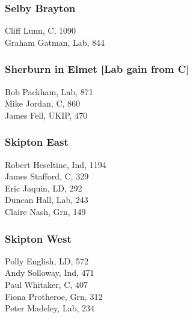 \documentclass[a4paper,openany,10pt]{book}
\begin{document}
\subsubsection*{Selby Brayton}



Cliff Lunn, C, 1090\\
Graham Gatman, Lab, 844\\


\subsubsection*{Sherburn in Elmet \hspace*{\fill}\nolinebreak[1]%
\enspace\hspace*{\fill}
[Lab gain from C]}



Bob Packham, Lab, 871\\
Mike Jordan, C, 860\\
James Fell, UKIP, 470\\


\subsubsection*{Skipton East}



Robert Heseltine, Ind, 1194\\
James Stafford, C, 329\\
Eric Jaquin, LD, 292\\
Duncan Hall, Lab, 243\\
Claire Nash, Grn, 149\\


\subsubsection*{Skipton West}



Polly English, LD, 572\\
Andy Solloway, Ind, 471\\
Paul Whitaker, C, 407\\
Fiona Protheroe, Grn, 312\\
Peter Madeley, Lab, 234\\
\end{document}
